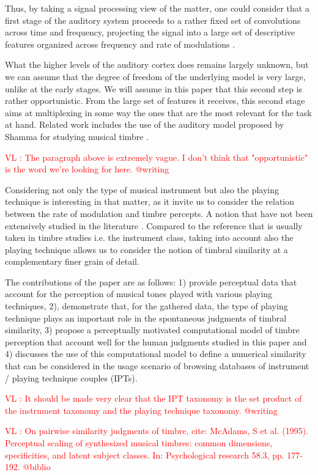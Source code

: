 \documentclass{article}
\makeatletter
\newcommand*{\ie}{i.e.\@\xspace}
\newcommand{\ipts}{IPTs\xspace}
\newcommand{\vl}[1]{\textcolor{red}{VL : #1}}
\makeatother
\begin{document}
Thus, by taking a signal processing view of the matter, one could consider that a first stage of the auditory system proceeds to a rather fixed set of convolutions across time and frequency, projecting the signal into a large set of descriptive features organized across frequency and rate of modulations \cite{anden2014deep}.

What the higher levels of the auditory cortex does remains largely unknown, but we can assume that the degree of freedom of the underlying model is very large, unlike at the early stages.  We will assume in this paper that this second step is rather opportunistic. From the large set of features it receives, this second stage aims at multiplexing in some way the ones that are the most relevant for the task at hand. Related work includes the use of the auditory model proposed by Shamma for studying musical timbre \cite{patil2012music}.

\vl{The paragraph above is extremely vague. I don't think that "opportunistic" is the word we're looking for here. @writing}

Considering not only the type of musical instrument but also the playing technique is interesting in that matter, as it invite us to consider the relation between the rate of modulation and timbre percepts. A notion that have not been extensively studied in the literature \cite{burred2010dynamic}. Compared to the reference that is usually taken in timbre studies \ie{} the instrument class, taking into account also the playing technique allows us to consider the notion of timbral similarity at a complementary finer grain of detail.

The contributions of the paper are as follows:
1) provide perceptual data that account for the perception of musical tones played with various playing techniques, 2), demonstrate that, for the gathered data, the type of playing technique plays an important role in the spontaneous judgments of timbral similarity, 3) propose a perceptually motivated computational model of timbre perception that account well for the human judgments studied in this paper and 4) discusses the use of this computational model to define a numerical similarity that can be considered in the usage scenario of browsing databases of instrument / playing technique couples (\ipts).

\vl{It should be made very clear that the IPT taxonomy is
the set product of the instrument taxonomy
and the playing technique taxonomy. @writing}

\vl{On pairwise similarity judgments of timbre, cite:
McAdams, S et al. (1995). Perceptual scaling of synthesized musical
timbres: common dimensions, specificities, and latent subject
classes. In: Psychological research 58.3, pp. 177-192.
@biblio}
\end{document}
